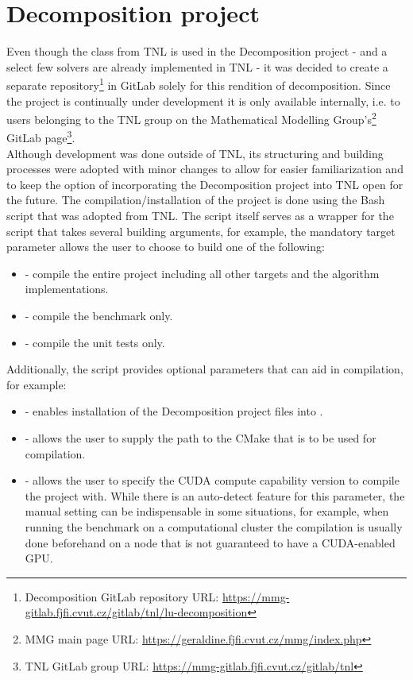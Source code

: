 \section{Decomposition project \TO}\label{Section:implementation-decomposition-project}
Even though the  class from TNL is used in the Decomposition project - and a select few solvers are already implemented in TNL - it was decided to create a separate repository\footnote{\label{Footnote:decomposition-project-gitlab-url}Decomposition GitLab repository URL: \url{https://mmg-gitlab.fjfi.cvut.cz/gitlab/tnl/lu-decomposition}} in GitLab solely for this rendition of decomposition. Since the project is continually under development it is only available internally,
i.e. to users belonging to the TNL group on the Mathematical Modelling Group's\footnote{MMG main page URL: \url{https://geraldine.fjfi.cvut.cz/mmg/index.php}} GitLab page\footnote{TNL GitLab group URL: \url{https://mmg-gitlab.fjfi.cvut.cz/gitlab/tnl}}. \\
Although development was done outside of TNL, its structuring and building processes were adopted with minor changes to allow for easier familiarization and to keep the option of incorporating the Decomposition project into TNL open for the future. The compilation/installation of the project is done using the  Bash script that was adopted from TNL. The script itself serves as a wrapper for the  script that takes several building arguments, for example, the mandatory target parameter allows the user to choose to build one of the following:

\begin{itemize}
	\item {} - compile the entire project including all other targets and the algorithm implementations.
	\item {} - compile the benchmark only.
	\item {} - compile the unit tests only.
\end{itemize}

Additionally, the  script provides optional parameters that can aid in compilation, for example:
\begin{itemize}
	\item {} - enables installation of the Decomposition project files into .
	\item {} - allows the user to supply the path to the CMake that is to be used for compilation.
	\item {} - allows the user to specify the CUDA compute capability version to compile the project with. While there is an auto-detect feature for this parameter, the manual setting can be indispensable in some situations, for example, when running the benchmark on a computational cluster the compilation is usually done beforehand on a node that is not guaranteed to have a CUDA-enabled GPU. 
\end{itemize}

